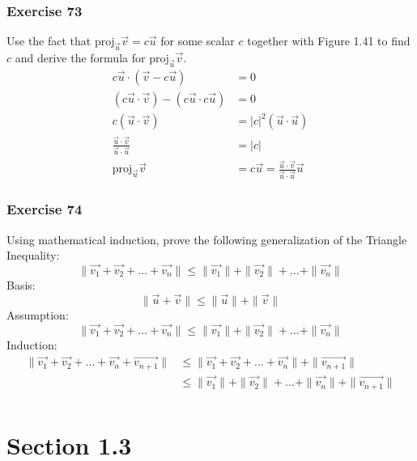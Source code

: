 \documentclass{math}
\begin{document}
\subsubsection*{Exercise 73}
Use the fact that \( \text{proj}_{\vec{u}}\vec{v} = c\vec{u} \) for some scalar
\( c \) together with Figure 1.41 to find \( c \) and derive the formula for
\( \text{proj}_{\vec{u}}\vec{v} \).
\begin{align*}
  c\vec{u}\cdot(\vec{v}-c\vec{u}) &= 0 \\
  (c\vec{u}\cdot\vec{v})-(c\vec{u}\cdot c\vec{u}) &= 0 \\
  c(\vec{u}\cdot\vec{v}) &= |c|^2(\vec{u}\cdot\vec{u}) \\
  \frac{\vec{u}\cdot\vec{v}}{\vec{u}\cdot\vec{u}} &= |c| \\
  \text{proj}_{\vec{u}}\vec{v} &= c\vec{u} =
    \frac{\vec{u}\cdot\vec{v}}{\vec{u}\cdot\vec{u}}\vec{u}
\end{align*}

\subsubsection*{Exercise 74}
Using mathematical induction, prove the following generalization of the
Triangle Inequality:
\[ \|\vec{v_1}+\vec{v_2}+\dots+\vec{v_n}\| \le
  \|\vec{v_1}\|+\|\vec{v_2}\|+\dots+\|\vec{v_n}\| \]
Basis:
\[ \|\vec{u}+\vec{v}\| \le \|\vec{u}\|+\|\vec{v}\| \]
Assumption:
\[ \|\vec{v_1}+\vec{v_2}+\dots+\vec{v_n}\| \le
  \|\vec{v_1}\|+\|\vec{v_2}\|+\dots+\|\vec{v_n}\| \]
Induction:
\begin{align*}
  \|\vec{v_1}+\vec{v_2}+\dots+\vec{v_n}+\vec{v_{n+1}}\| &\le
    \|\vec{v_1}+\vec{v_2}+\dots+\vec{v_n}\|+\|\vec{v_{n+1}}\| \\
  &\le \|\vec{v_1}\|+\|\vec{v_2}\|+\dots+\|\vec{v_n}\|+\|\vec{v_{n+1}}\| \\
\end{align*}

\section*{Section 1.3}
\end{document}
